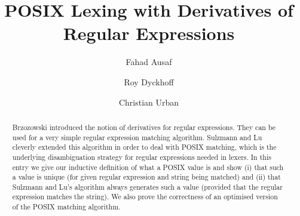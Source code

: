 \documentclass[11pt,a4paper]{article}
\begin{document}
\title{POSIX Lexing with Derivatives of Regular Expressions}
\author{Fahad Ausaf \and Roy Dyckhoff \and Christian Urban}
\maketitle

\begin{abstract}
  Brzozowski introduced the notion of derivatives for regular
  expressions. They can be used for a very simple regular expression
  matching algorithm. Sulzmann and Lu \cite{Sulzmann2014} cleverly extended this algorithm
  in order to deal with POSIX matching, which is the underlying
  disambiguation strategy for regular expressions needed in
  lexers. In this entry we give our inductive definition
  of what a POSIX value is and show (i) that such a value is unique (for
  given regular expression and string being matched) and (ii) that
  Sulzmann and Lu's algorithm always generates such a value (provided
  that the regular expression matches the string). We also prove the
  correctness of an optimised version of the POSIX matching
  algorithm. 
\end{abstract}

\tableofcontents





\end{document}
